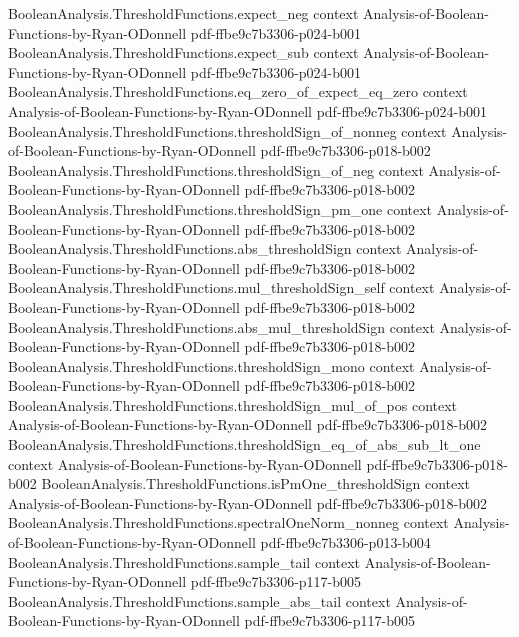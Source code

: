 \begin{theorem}
  {BooleanAnalysis.ThresholdFunctions.expect_neg}
  {context}
  {Analysis-of-Boolean-Functions-by-Ryan-ODonnell}
  {pdf-ffbe9c7b3306-p024-b001}
\proofstep
  {BooleanAnalysis.ThresholdFunctions.expect_sub}
  {context}
  {Analysis-of-Boolean-Functions-by-Ryan-ODonnell}
  {pdf-ffbe9c7b3306-p024-b001}
\proofstep
  {BooleanAnalysis.ThresholdFunctions.eq_zero_of_expect_eq_zero}
  {context}
  {Analysis-of-Boolean-Functions-by-Ryan-ODonnell}
  {pdf-ffbe9c7b3306-p024-b001}
\proofstep
  {BooleanAnalysis.ThresholdFunctions.thresholdSign_of_nonneg}
  {context}
  {Analysis-of-Boolean-Functions-by-Ryan-ODonnell}
  {pdf-ffbe9c7b3306-p018-b002}
\proofstep
  {BooleanAnalysis.ThresholdFunctions.thresholdSign_of_neg}
  {context}
  {Analysis-of-Boolean-Functions-by-Ryan-ODonnell}
  {pdf-ffbe9c7b3306-p018-b002}
\proofstep
  {BooleanAnalysis.ThresholdFunctions.thresholdSign_pm_one}
  {context}
  {Analysis-of-Boolean-Functions-by-Ryan-ODonnell}
  {pdf-ffbe9c7b3306-p018-b002}
\proofstep
  {BooleanAnalysis.ThresholdFunctions.abs_thresholdSign}
  {context}
  {Analysis-of-Boolean-Functions-by-Ryan-ODonnell}
  {pdf-ffbe9c7b3306-p018-b002}
\proofstep
  {BooleanAnalysis.ThresholdFunctions.mul_thresholdSign_self}
  {context}
  {Analysis-of-Boolean-Functions-by-Ryan-ODonnell}
  {pdf-ffbe9c7b3306-p018-b002}
\proofstep
  {BooleanAnalysis.ThresholdFunctions.abs_mul_thresholdSign}
  {context}
  {Analysis-of-Boolean-Functions-by-Ryan-ODonnell}
  {pdf-ffbe9c7b3306-p018-b002}
\proofstep
  {BooleanAnalysis.ThresholdFunctions.thresholdSign_mono}
  {context}
  {Analysis-of-Boolean-Functions-by-Ryan-ODonnell}
  {pdf-ffbe9c7b3306-p018-b002}
\proofstep
  {BooleanAnalysis.ThresholdFunctions.thresholdSign_mul_of_pos}
  {context}
  {Analysis-of-Boolean-Functions-by-Ryan-ODonnell}
  {pdf-ffbe9c7b3306-p018-b002}
\proofstep
  {BooleanAnalysis.ThresholdFunctions.thresholdSign_eq_of_abs_sub_lt_one}
  {context}
  {Analysis-of-Boolean-Functions-by-Ryan-ODonnell}
  {pdf-ffbe9c7b3306-p018-b002}
\proofstep
  {BooleanAnalysis.ThresholdFunctions.isPmOne_thresholdSign}
  {context}
  {Analysis-of-Boolean-Functions-by-Ryan-ODonnell}
  {pdf-ffbe9c7b3306-p018-b002}
\proofstep
  {BooleanAnalysis.ThresholdFunctions.spectralOneNorm_nonneg}
  {context}
  {Analysis-of-Boolean-Functions-by-Ryan-ODonnell}
  {pdf-ffbe9c7b3306-p013-b004}
\proofstep
  {BooleanAnalysis.ThresholdFunctions.sample_tail}
  {context}
  {Analysis-of-Boolean-Functions-by-Ryan-ODonnell}
  {pdf-ffbe9c7b3306-p117-b005}
\proofstep
  {BooleanAnalysis.ThresholdFunctions.sample_abs_tail}
  {context}
  {Analysis-of-Boolean-Functions-by-Ryan-ODonnell}
  {pdf-ffbe9c7b3306-p117-b005}

\end{theorem}
